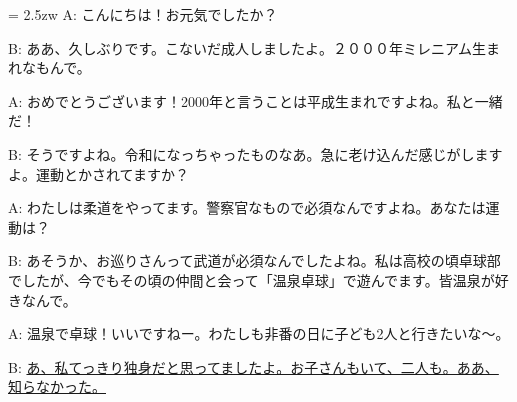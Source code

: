 \documentclass[11pt]{amsart}
\title{}
\author{}
\newenvironment{hangall}[1]{\hangindent = 2.5zw\everypar{\hangindent = 2.5zw}}{}
\begin{document}
\maketitle
\begin{hangall}{}%
A: こんにちは！お元気でしたか？

B: ああ、久しぶりです。こないだ成人しましたよ。２０００年ミレニアム生まれなもんで。

A: おめでとうございます！2000年と言うことは平成生まれですよね。私と一緒だ！

B: そうですよね。令和になっちゃったものなあ。急に老け込んだ感じがしますよ。運動とかされてますか？

A: わたしは柔道をやってます。警察官なもので必須なんですよね。あなたは運動は？

B: あそうか、お巡りさんって武道が必須なんでしたよね。私は高校の頃卓球部でしたが、今でもその頃の仲間と会って「温泉卓球」で遊んでます。皆温泉が好きなんで。

A: 温泉で卓球！いいですねー。わたしも非番の日に子ども2人と行きたいな〜。

B: \ul{あ、私てっきり独身だと思ってましたよ。お子さんもいて、二人も。ああ、知らなかった。}\end{hangall}
\end{document}
